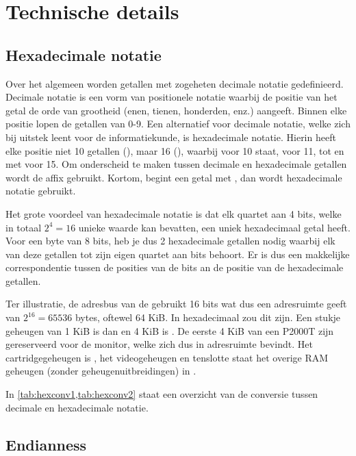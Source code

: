 \chapter{Technische details}
\chapterpreamble

%
%
%
\section{Hexadecimale notatie}
\label{sec:hexnot}

Over het algemeen worden getallen met zogeheten decimale notatie gedefinieerd. Decimale notatie is een vorm van positionele notatie waarbij de positie van het getal de orde van grootheid (enen, tienen, honderden, enz.) aangeeft. Binnen elke positie lopen de getallen van 0-9. Een alternatief voor decimale notatie, welke zich bij uitstek leent voor de informatiekunde, is hexadecimale notatie. Hierin heeft elke positie niet 10 getallen (), maar 16 (), waarbij  voor 10 staat,  voor 11, tot en met  voor 15. Om onderscheid te maken tussen decimale en hexadecimale getallen wordt de affix  gebruikt. Kortom, begint een getal met , dan wordt hexadecimale notatie gebruikt.

Het grote voordeel van hexadecimale notatie is dat elk quartet aan 4 bits, welke in totaal $2^{4} = 16$ unieke waarde kan bevatten, een uniek hexadecimaal getal heeft. Voor een byte van 8 bits, heb je dus 2 hexadecimale getallen nodig waarbij elk van deze getallen tot zijn eigen quartet aan bits behoort. Er is dus een makkelijke correspondentie tussen de posities van de bits an de positie van de hexadecimale getallen.

Ter illustratie, de adresbus van de  gebruikt 16 bits wat dus een adresruimte geeft van $2^{16} = 65536$ bytes, oftewel 64 KiB. In hexadecimaal zou dit  zijn. Een stukje geheugen van 1 KiB is dan  en 4 KiB is . De eerste 4 KiB van een P2000T zijn gereserveerd voor de monitor, welke zich dus in adresruimte  bevindt. Het cartridgegeheugen is , het videogeheugen  en tenslotte staat het overige RAM geheugen (zonder geheugenuitbreidingen) in .

In \cref{tab:hexconv1,tab:hexconv2} staat een overzicht van de conversie tussen decimale en hexadecimale notatie.



%
%
%
\section{Endianness}
\label{sec:endianness}


